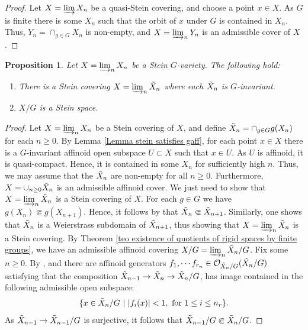 \documentclass{amsart}
\newtheorem{prop}[defi]{ Proposition}
\newcommand{\OX}{\mathcal{O}}
\begin{document}
\begin{proof}
Let $X=\varinjlim X_n$ be a quasi-Stein covering, and choose a point $x\in X$. As $G$ is finite there is some $X_n$ such that the orbit of $x$ under $G$ is contained in $X_n$. Thus, $Y_n=\cap_{g\in G}X_n$ is non-empty, and  $X=\varinjlim_n Y_n$ is an admissible cover of $X$.
\end{proof}
\begin{prop}\label{prop quotients of Stein are Stein}
Let $X=\varinjlim_nX_n$ be a Stein $G$-variety. The following hold:
\begin{enumerate}[label=(\roman*)]
\item There is a Stein covering $X=\varinjlim_n\Tilde{X}_n$ where each $\Tilde{X}_n$ is $G$-invariant.
    \item $X/G$ is a Stein space.   
\end{enumerate}
\end{prop}
\begin{proof}
Let $X=\varinjlim_n X_n$ be a Stein covering of $X$, and define $\Tilde{X}_n=\cap_{g\in G}g(X_n)$ for each $n\geq 0$. By Lemma \ref{Lemma stein satisfies gaff}, for each point $x\in X$ there is a $G$-invariant affinoid open subspace $U\subset X$  such that $x\in U$. As $U$ is affinoid, it is quasi-compact. Hence, it is contained in some $X_n$ for sufficiently high $n$. Thus, we may assume that the $\Tilde{X}_n$ are non-empty for all $n\geq 0$. Furthermore, $X=\cup_{n\geq 0}\Tilde{X}_n$ is an admissible affinoid cover. We just need to show that $X=\varinjlim_n \Tilde{X}_n$ is a Stein covering of $X$. For each $g\in G$ we have $g(X_n)\Subset g(X_{n+1})$. Hence, it follows by \cite[Lemma 6.3.7]{bosch2014lectures} that $\Tilde{X}_n\Subset \Tilde{X}_{n+1}$. Similarly, one shows that $\Tilde{X}_n$ is a Weierstrass subdomain of $\Tilde{X}_{n+1}$, thus showing that  $X=\varinjlim_n \Tilde{X}_n$ is a Stein covering. By Theorem \ref{teo existence of quotients of rigid spaces by finite groups}, we have an admissible affinoid covering $X/G=\varinjlim_n \Tilde{X}_n/G$. Fix some $n\geq 0$. By \cite[Proposition 2.5.2]{berkovich2012spectral}, and \cite[Corollary 2.5.5]{berkovich2012spectral} there are affinoid generators $f_1,\cdots f_{r_n}\in \OX_{\Tilde{X}_n/G}(\Tilde{X}_n/G)$ satisfying that the composition $\Tilde{X}_{n-1}\rightarrow \Tilde{X}_{n}\rightarrow \Tilde{X}_{n}/G$, has image contained in the following admissible open subspace:
\begin{equation*}
   \{ x\in \Tilde{X}_{n}/G \textnormal{ } \vert \textnormal{ } \vert f_i(x)\vert < 1, \textnormal{ for }1\leq i\leq n_r\}. 
\end{equation*}
As $\Tilde{X}_{n-1}\rightarrow \Tilde{X}_{n-1}/G$ is surjective,
it follows that $\Tilde{X}_{n-1}/G\Subset \Tilde{X}_{n}/G$.
\end{proof}
\end{document}

